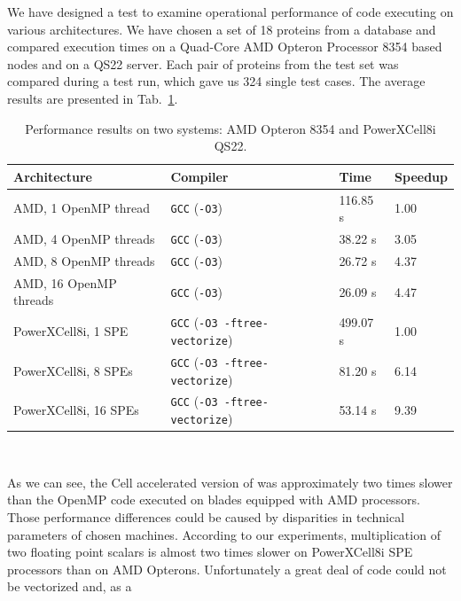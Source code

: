 We have designed a test to examine operational performance of \prog{} code
executing on various architectures.
We have chosen a set of 18 proteins from a database and compared execution times
on a Quad-Core AMD Opteron Processor 8354 based nodes and on a QS22 server.
Each pair of proteins from the test set was compared during a test run, which
gave us 324 single test cases.
The average results are presented in Tab.~\ref{tab:t5}.
\begin{table}[htb]
\begin{footnotesize}
\caption{Performance results on two systems: AMD Opteron 8354 and PowerXCell8i QS22.}
\label{tab:t5}
\newcommand{\m}{\hphantom{$-$}}
\newcommand{\cc}[1]{\multicolumn{1}{c}{#1}}
\renewcommand{\tabcolsep}{0.5pc} %
\renewcommand{\arraystretch}{1.2} %
\begin{tabular}{@{}llll}
\hline
\textbf{Architecture} & \textbf{Compiler} & \textbf{Time} & \textbf{Speedup} \\
\hline
AMD, 1 OpenMP thread & \texttt{GCC} (\texttt{-O3}) & 116.85 s & 1.00 \\
AMD, 4 OpenMP threads & \texttt{GCC} (\texttt{-O3}) & 38.22 s & 3.05 \\
AMD, 8 OpenMP threads & \texttt{GCC} (\texttt{-O3}) & 26.72 s & 4.37 \\
AMD, 16 OpenMP threads & \texttt{GCC} (\texttt{-O3}) & 26.09 s & 4.47 \\
\hline
PowerXCell8i, 1 SPE & \texttt{GCC} (\texttt{-O3 -ftree-vectorize}) & 499.07 s & 1.00 \\
PowerXCell8i, 8 SPEs & \texttt{GCC} (\texttt{-O3 -ftree-vectorize}) &  81.20 s & 6.14 \\
PowerXCell8i, 16 SPEs & \texttt{GCC} (\texttt{-O3 -ftree-vectorize}) & 53.14 s & 9.39 \\
\hline
\end{tabular}\\[2pt]
\end{footnotesize}
\end{table}
As we can see, the Cell accelerated version of \prog{} was approximately
two times slower than the OpenMP code executed on blades equipped with AMD
processors.
Those performance differences could be caused by disparities in technical
parameters of chosen machines.
According to our experiments, multiplication of two floating point scalars is
almost two times slower on PowerXCell8i SPE processors than on AMD Opterons.
Unfortunately a great deal of \prog{} code could not be vectorized and, as a

